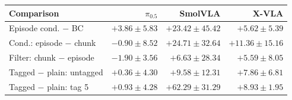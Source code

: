 \begin{tabular}{lrrr}
\toprule
Comparison & $\pi_{0.5}$ & SmolVLA & X-VLA \\
\midrule
Episode cond. $-$ BC & $+3.86 \pm 5.83$ & $+23.42 \pm 45.42$ & $+5.62 \pm 5.39$ \\
Cond.: episode $-$ chunk & $-0.90 \pm 8.52$ & $+24.71 \pm 32.64$ & $+11.36 \pm 15.16$ \\
Filter: chunk $-$ episode & $-1.90 \pm 3.56$ & $+6.63 \pm 28.34$ & $+5.59 \pm 8.05$ \\
Tagged $-$ plain: untagged & $+0.36 \pm 4.30$ & $+9.58 \pm 12.31$ & $+7.86 \pm 6.81$ \\
Tagged $-$ plain: tag 5 & $+0.93 \pm 4.28$ & $+62.29 \pm 31.29$ & $+8.93 \pm 1.95$ \\
\bottomrule
\end{tabular}
